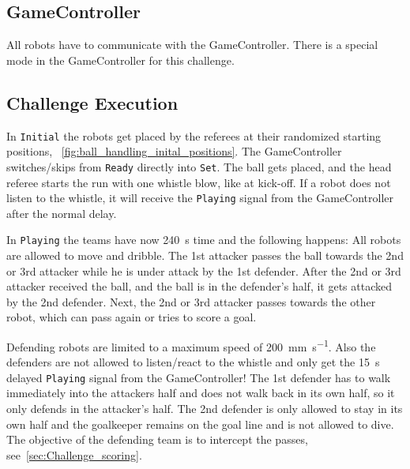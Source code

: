 \subsection{GameController}
All robots have to communicate with the GameController. There is a special mode in the GameController for this challenge. 

\subsection{Challenge Execution}

In \texttt{Initial} the robots get placed by the referees at their randomized starting positions, \cf~\cref{fig:ball_handling_inital_positions}. The GameController switches/skips from \texttt{Ready} directly into \texttt{Set}. The ball gets placed, and the head referee starts the run with one whistle blow, like at kick-off. If a robot does not listen to the whistle, it will receive the \texttt{Playing} signal from the GameController after the normal delay.

In \texttt{Playing} the teams have now \qty{240}{\second} time and the following happens: All robots are allowed to move and dribble. The 1st attacker passes the ball towards the 2nd or 3rd attacker while he is under attack by the 1st defender. After the 2nd or 3rd attacker received the ball, and the ball is in the defender's half, it gets attacked by the 2nd defender. Next, the 2nd or 3rd attacker passes towards the other robot, which can pass again or tries to score a goal.

Defending robots are limited to a maximum speed of \qty{200}{\mm \per \second}. Also the defenders are not allowed to listen/react to the whistle and only get the \qty{15}{\second} delayed \texttt{Playing} signal from the GameController! The 1st defender has to walk immediately into the attackers half and does not walk back in its own half, so it only defends in the attacker's half. The 2nd defender is only allowed to stay in its own half and the goalkeeper remains on the goal line and is not allowed to dive. The objective of the defending team is to intercept the passes, see~\cref{sec:Challenge_scoring}.

